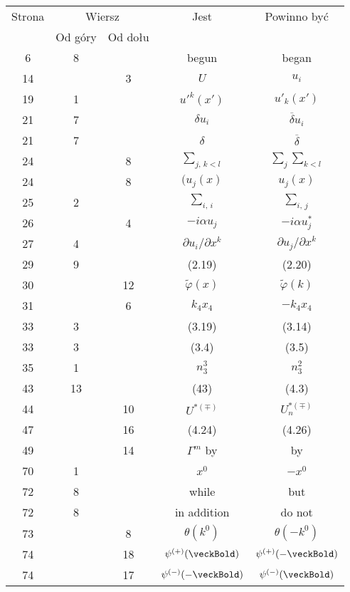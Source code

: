 \documentclass[a4paper,11pt]{article}
\numberwithin{equation}{section}
\begin{document}
\begin{center}

  \begin{tabular}{|c|c|c|c|c|}
    \hline
    Strona & \multicolumn{2}{c|}{Wiersz} & Jest
                              & Powinno być \\ \cline{2-3}
    & Od góry & Od dołu & & \\
    \hline
    6 & 8 & & begun & began \\
    14 & & 3 & $U$ & $u_{ i }$ \\
    19 & 1 & & $u'^{ k }( x' )$ & $u'_{ k }( x' )$ \\
    21 & 7 & & $\delta u_{ i }$ & $\overline{ \delta } u_{ i }$ \\
    21 & 7 & & $\delta$ & $\overline{ \delta }$ \\
    24 & & 8 & $\sum\limits_{ j,\, k < l }$
           & $\sum\limits_{ j } \sum\limits_{ k < l }$ \\
    24 & & 8 & $( u_{ j }( x )$ & $u_{ j }( x )$ \\
    25 & 2 & & $\sum\limits_{ i,\, i }$ & $\sum\limits_{ i,\, j }$ \\
    26 & & 4 & $-i \alpha u_{ j }$ & $-i \alpha u_{ j }^{ * }$ \\
    27 & 4 & & $\partial u_{ i } / \partial x^{ k }$
           & $\partial u_{ j } / \partial x^{ k }$ \\
    29 & 9 & & (2.19) & (2.20) \\
    30 & & 12 & $\tilde{ \varphi }( x )$ & $\tilde{ \varphi }( k )$ \\
    31 & & 6 & $k_{ 4 } x_{ 4 }$ & $-k_{ 4 } x_{ 4 }$ \\
    33 & 3 & & (3.19) & (3.14) \\
    33 & 3 & & (3.4) & (3.5) \\
    35 & 1 & & $n_{ 3 }^{ 3 }$ & $n_{ 3 }^{ 2 }$ \\
    43 & 13 & & (43) & (4.3) \\
    44 & & 10 & $U^{ *( \mp ) }$ & $U_{ n }^{ *( \mp ) }$ \\
    47 & & 16 & (4.24) & (4.26) \\
    49 & & 14 & $\Gamma^{ m }$ by & by \\
    70 & 1 & & $x^{ 0 }$ & $-x^{ 0 }$ \\
    72 & 8 & & while & but \\
    72 & 8 & & in addition & do not \\
    73 & & 8 & $\theta( k^{ 0 } )$ & $\theta( -k^{ 0 } )$ \\
    74 & & 18 & $\psi^{ ( + ) }( \veckBold )$
           & $\psi^{ ( + ) }( -\veckBold )$ \\
    74 & & 17 & $\psi^{ ( - ) }( -\veckBold )$
           & $\psi^{ ( - ) }( \veckBold )$ \\
    \hline
  \end{tabular}


\end{center}
\end{document}
